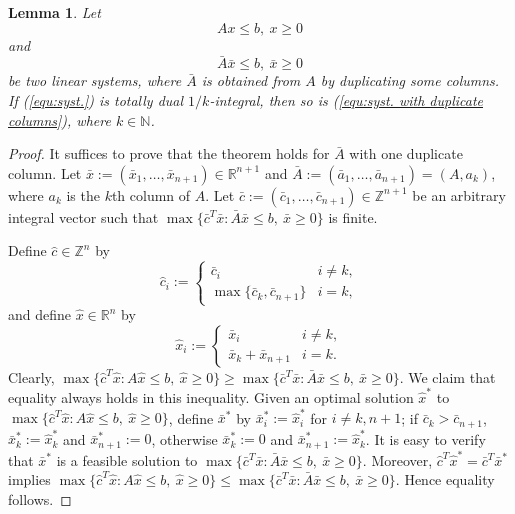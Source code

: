 \documentclass[11pt]{article}
\newtheorem{lemma}[theorem]{Lemma}
\numberwithin{theorem}{section}
\begin{document}
\begin{lemma}
\label{lem:reduct2}
Let 
\begin{equation}\label{equ:syst.}
Ax\leq b,~x\geq 0
\end{equation}
and
\begin{equation}\label{equ:syst. with duplicate columns}
\bar{A}\bar{x}\leq b,~\bar{x}\geq 0
\end{equation}
be two linear systems, where $\bar{A}$ is obtained from $A$ by duplicating some columns. If (\ref{equ:syst.}) is totally dual $1/k$-integral, then so is (\ref{equ:syst. with duplicate columns}), where $k\in \mathbb{N}$.
\end{lemma}
\begin{proof}
It suffices to prove that the theorem holds for $\bar{A}$ with one duplicate column.
Let $\bar{x}:=(\bar{x}_1,\ldots,\bar{x}_{n+1})\in\mathbb{R}^{n+1}$ and $\bar{A}:=(\bar{a}_1,\ldots,\bar{a}_{n+1})=(A,a_{k})$, where $a_k$ is the $k$th column of $A$. Let $\bar{c}:=(\bar{c}_1,\ldots,\bar{c}_{n+1})\in \mathbb{Z}^{n+1}$ be an arbitrary integral vector such that $\max\{\bar{c}^T \bar{x}: \bar{A}\bar{x}\leq b,~\bar{x}\geq 0\}$ is finite. 

Define $\hat{c}\in \mathbb{Z}^n$ by
\begin{equation*}
\hat{c}_i:=
\begin{cases}
\bar{c}_i & i\not=k,\\
\max\{\bar{c}_k, \bar{c}_{n+1}\} & i=k,
\end{cases}
\end{equation*}
and define $\hat{x}\in \mathbb{R}^n$ by
\begin{equation*}
\hat{x}_i:=
\begin{cases}
\bar{x}_i & i\not=k,\\
\bar{x}_k+\bar{x}_{n+1} & i=k.
\end{cases}
\end{equation*}
Clearly,  $\max\{\hat{c}^T \hat{x}:A\hat{x}\leq b,~\hat{x}\geq 0\}\geq\max\{\bar{c}^T \bar{x}:\bar{A}\bar{x}\leq b,~\bar{x}\geq 0\}$. We claim that equality always holds in this inequality. Given an optimal solution $\hat{x}^*$ to $\max\{\hat{c}^T \hat{x}:A\hat{x}\leq b,~\hat{x}\geq 0\}$, define $\bar{x}^*$ by $\bar{x}^*_i:=\hat{x}^*_i$ for $i\not=k,n+1$; if $\bar{c}_k>\bar{c}_{n+1}$, $\bar{x}^*_k:=\hat{x}^*_k$ and $\bar{x}^*_{n+1}:=0$, otherwise $\bar{x}^*_k:=0$ and $\bar{x}^*_{n+1}:=\hat{x}^*_k$. It is easy to verify that $\bar{x}^*$ is a feasible solution to $\max\{\bar{c}^T \bar{x}:\bar{A}\bar{x}\leq b,~\bar{x}\geq 0\}$. Moreover, $\hat{c}^T\hat{x}^*=\bar{c}^T\bar{x}^*$ implies $\max\{\hat{c}^T \hat{x}:A\hat{x}\leq b,~\hat{x}\geq 0\}\leq\max\{\bar{c}^T \bar{x}:\bar{A}\bar{x}\leq b,~\bar{x}\geq 0\}$. Hence equality follows.


\end{proof}
\end{document}
